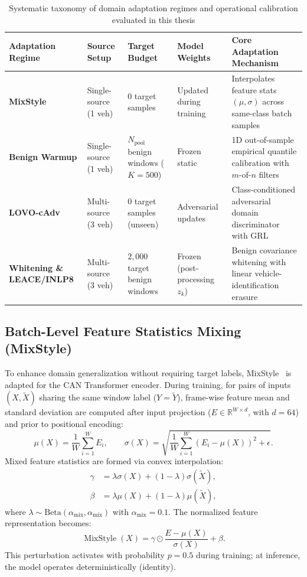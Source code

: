 \documentclass[12pt, a4paper, reqno, oneside]{book}
\begin{document}
{\small\setlength{\tabcolsep}{3.5pt}
\begin{table}[htbp]\centering
\caption[Systematic taxonomy of domain adaptation and calibration mechanisms]{Systematic taxonomy of domain adaptation regimes and operational calibration evaluated in this thesis}\label{tab:adaptation-taxonomy}
\begin{tabular}{P{2.5cm}P{2.8cm}P{2.8cm}P{2.0cm}P{4.7cm}}
\toprule
Adaptation Regime & Source Setup & Target Budget & Model Weights & Core Adaptation Mechanism\\\midrule
\textbf{MixStyle} & Single-source (1 veh) & $0$ target samples & Updated during training & Interpolates feature stats $(\mu, \sigma)$ across same-class batch samples\\
\textbf{Benign Warmup} & Single-source (1 veh) & $N_{\text{pool}}$ benign windows ($K=500$) & Frozen static & 1D out-of-sample empirical quantile calibration with $m$-of-$n$ filters\\
\textbf{LOVO-cAdv} & Multi-source (3 veh) & $0$ target samples (unseen) & Adversarial updates & Class-conditioned adversarial domain discriminator with GRL\\
\textbf{Whitening \& LEACE/INLP8} & Multi-source (3 veh) & $2{,}000$ target benign windows & Frozen (post-processing $z_k$) & Benign covariance whitening with linear vehicle-identification erasure\\
\bottomrule\end{tabular}
\end{table}}

\subsection{Batch-Level Feature Statistics Mixing (MixStyle)}\label{subsec:method-mixstyle}
To enhance domain generalization without requiring target labels, MixStyle~\cite{zhou2021mixstyle} is adapted for the CAN Transformer encoder. During training, for pairs of inputs $(X, \widetilde{X})$ sharing the same window label ($Y = \widetilde{Y}$), frame-wise feature mean and standard deviation are computed after input projection ($E \in \mathbb{R}^{W \times d}$, with $d=64$) and prior to positional encoding:
\begin{equation}
\mu(X) = \frac{1}{W}\sum_{i=1}^W E_i, \qquad \sigma(X) = \sqrt{\frac{1}{W}\sum_{i=1}^W (E_i - \mu(X))^2 + \epsilon}.
\end{equation}
Mixed feature statistics are formed via convex interpolation:
\begin{align}
\gamma &= \lambda \sigma(X) + (1 - \lambda) \sigma(\widetilde{X}),\\
\beta &= \lambda \mu(X) + (1 - \lambda) \mu(\widetilde{X}),
\end{align}
where $\lambda \sim \text{Beta}(\alpha_{\text{mix}}, \alpha_{\text{mix}})$ with $\alpha_{\text{mix}} = 0.1$. The normalized feature representation becomes:
\begin{equation}
\operatorname{MixStyle}(X) = \gamma \odot \frac{E - \mu(X)}{\sigma(X)} + \beta.
\end{equation}
This perturbation activates with probability $p=0.5$ during training; at inference, the model operates deterministically (identity).
\end{document}
